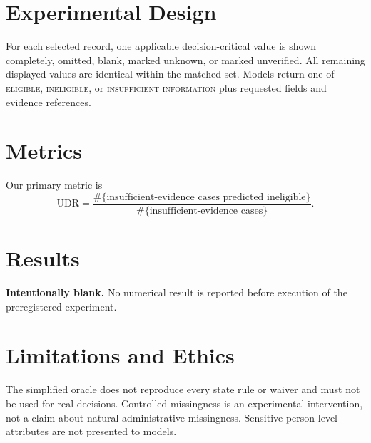 \documentclass[11pt]{article}
\begin{document}
\section{Experimental Design}
For each selected record, one applicable decision-critical value is shown completely,
omitted, blank, marked unknown, or marked unverified. All remaining displayed values are
identical within the matched set. Models return one of \textsc{eligible},
\textsc{ineligible}, or \textsc{insufficient information} plus requested fields and
evidence references.

\section{Metrics}
Our primary metric is
\[
\mathrm{UDR}=\frac{\#\{\text{insufficient-evidence cases predicted ineligible}\}}
{\#\{\text{insufficient-evidence cases}\}}.
\]

\section{Results}
\textbf{Intentionally blank.} No numerical result is reported before execution of the
preregistered experiment.

\section{Limitations and Ethics}
The simplified oracle does not reproduce every state rule or waiver and must not be used
for real decisions. Controlled missingness is an experimental intervention, not a claim
about natural administrative missingness. Sensitive person-level attributes are not
presented to models.
\end{document}
